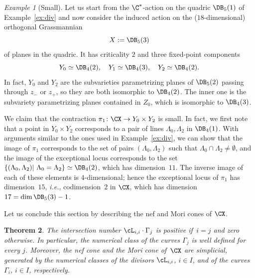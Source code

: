 \documentclass[11pt]{amsart}
\numberwithin{equation}{section}
\newtheorem{theorem}{Theorem}[section]
\theoremstyle{definition}
\theoremstyle{remark}
\newtheorem{example}[theorem]{Example}
\begin{document}
\begin{example}[Small]\label{ex:sm}  Let us start from the $\C^*$-action on the quadric $\DB_5(1)$ of Example~\ref{ex:div} and now consider the induced action on the ($18$-dimensional) orthogonal Grassmannian \[X:=\DB_5(3)\] of planes in the quadric. It has criticality $2$ and three fixed-point components 
  \[
  Y_0\simeq\DB_4(2),\quad Y_1\simeq\DB_4(3),\quad Y_2\simeq\DB_4(2).
  \]
In fact, $Y_0$ and $Y_2$ are the subvarieties parametrizing planes of $\DB_5(2)$ passing through $z_-$ or $z_+$, so they are both isomorphic to $\DB_{4}(2)$. The inner one is the subvariety parametrizing planes contained in $Z_0$, which is isomorphic to $\DB_{4}(3)$.

We claim that the contraction $\pi_1\colon \CX\to Y_0\times Y_2$ is small. In fact, we first note that a point in $Y_0\times Y_2$ corresponds to a pair of lines $\Lambda_0,\Lambda_2$ in $\DB_4(1)$. With arguments similar to the ones used in Example~\ref{ex:div}, we can show that the image of $\pi_1$ corresponds to the set of pairs $(\Lambda_0,\Lambda_2)$ such that $\Lambda_0\cap \Lambda_2\neq \emptyset$, and the image of the exceptional locus corresponds to the set $\{(\Lambda_0,\Lambda_2)|\,\, \Lambda_0=\Lambda_2\}\simeq \DB_4(2)$, which has dimension~$11$. The inverse image of each of these elements is $4$-dimensional; hence the exceptional locus of $\pi_1$ has dimension~$15$, \textit{i.e.}, codimension~$2$ in $\CX$, which has dimension $17 = \dim \DB_5(3)-1$.
\end{example}

Let us conclude this section by  describing the nef and  Mori cones of $\CX$. 

\begin{theorem}\label{thm:nefcone}
The intersection number $\cL_{i,i}\cdot\Gamma_j$ is positive if\, $i=j$ and zero otherwise. In particular, the numerical class of the curves $\Gamma_j$ is well defined for every $j$. Moreover, the nef cone and the Mori cone of\, $\CX$ are simplicial, generated by the numerical classes of the divisors $\cL_{i,i}$, $i\in I$, and of the curves $\Gamma_i$, $i\in I$, respectively.
\end{theorem}
\end{document}
